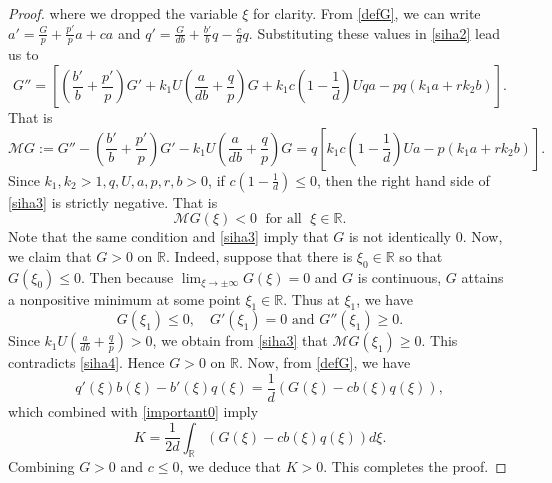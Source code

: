 \documentclass[10pt,a4paper]{amsart}
\newcommand{\CK}[1]{\color{red}{#1}\color{black}}
\def \M {\mathcal{M}}
\def \R {\mathbb{R}}
\def \dis {\displaystyle}
\begin{document}
\begin{proof}
where we dropped the variable $\xi$ for clarity.
From \eqref{defG}, we can write $a'=\frac{G}{p}+\frac{p'}{p}a+ca$ and $q'=\frac{G}{d b}+\frac{b'}{b}q-\frac{c}{d}q$. Substituting these values in \eqref{siha2} lead us to
\begin{equation*}
G''=\left[ \left( \frac{b'}{b}+\frac{p'}{p}\right)G' +k_1U\left( \frac{a}{d b}+\frac{q}{p}\right) G+ k_1c\left(1-\frac{1}{d}\right)Uqa -pq(k_1a+rk_2b)\right].
\end{equation*}
That is 
\begin{equation}\label{siha3}
\M G:=G''-\left( \frac{b'}{b}+\frac{p'}{p}\right)G' -k_1U\left( \frac{a}{d b}+\frac{q}{p}\right) G=q\left[ k_1c\left(1-\frac{1}{d}\right)Ua -p(k_1a+rk_2b)\right].
\end{equation}
Since $k_1,k_2>1, q,U,a,p,r,b>0$,  if $c\left(1-\frac{1}{d}\right)\leq0$, then the right hand side of \eqref{siha3} is strictly negative. %
That is  
\begin{equation}\label{siha4}
\M G(\xi)<0\; \text{ for all }\;  \xi\in \R.
\end{equation}
Note that the same condition  and \eqref{siha3} imply that $G$ is not identically $0$. Now, we claim that $G>0$ on $\R$. Indeed, suppose that there is $\xi_0\in \R$ so that $G(\xi_0)\leq 0$.  Then because  $\dis \lim_{\xi\to \pm\infty}G(\xi)=0$ and $G$ is continuous, $G$ attains a nonpositive minimum at some point $\xi_1 \in \R$. Thus at $\xi_1$, we have 
\begin{equation*}
G(\xi_1)\leq 0, \quad G'(\xi_1)=0 \text{ and } G''(\xi_1)\geq 0.
\end{equation*}
Since $k_1U\left( \frac{a}{d b}+\frac{q}{p}\right)>0$, we obtain from \eqref{siha3} that $\M G(\xi_1)\geq 0$. This contradicts \eqref{siha4}. Hence $G>0$ on $\R$. Now, from \eqref{defG}, we have 
\begin{equation*}
q'(\xi)b(\xi)-b'(\xi)q(\xi)=\frac{1}{d}\left( G(\xi)-cb(\xi)q(\xi)\right),
\end{equation*}
which combined with \eqref{important0} imply 
\begin{equation*}
K= \frac{1}{2d}\int_{\R}\left( G(\xi)-cb(\xi)q(\xi)\right)d\xi. 
\end{equation*}
Combining $G>0$ and $c\leq 0$, we deduce that $K>0$.  This completes the proof.
\end{proof}
\end{document}
